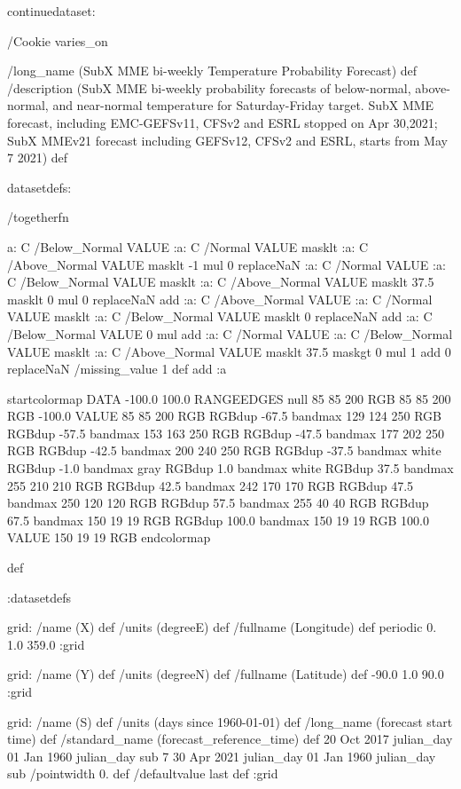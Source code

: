 \begin{ingrid}

continuedataset:



/Cookie varies_on


/long_name (SubX MME bi-weekly Temperature Probability Forecast) def
/description (SubX MME bi-weekly probability forecasts of below-normal, above-normal, and near-normal temperature for Saturday-Friday target. SubX MME forecast, including EMC-GEFSv11, CFSv2 and ESRL stopped on Apr 30,2021; SubX MMEv21 forecast including GEFSv12, CFSv2 and ESRL, starts from May 7 2021) def

datasetdefs:

/togetherfn {
 a:
    C /Below_Normal VALUE
    :a:
     C /Normal VALUE
     masklt
    :a:
     C /Above_Normal VALUE
     masklt
    -1 mul
    0 replaceNaN
    :a:
     C /Normal VALUE
     :a:
      C /Below_Normal VALUE
      masklt
     :a:
      C /Above_Normal VALUE
      masklt
     37.5 masklt
     0 mul
     0 replaceNaN           
     add
    :a:
     C /Above_Normal VALUE
     :a:
      C /Normal VALUE
      masklt
     :a:
      C /Below_Normal VALUE
      masklt
     0 replaceNaN
     add
 :a:
     C /Below_Normal VALUE
     0 mul
     add
    :a:
     C /Normal VALUE
     :a:
      C /Below_Normal VALUE
      masklt
     :a:
      C /Above_Normal VALUE        
      masklt
     37.5 maskgt
     0 mul
     1 add
     0 replaceNaN
     /missing_value 1 def
     add
    :a

startcolormap
DATA -100.0 100.0 RANGEEDGES
null 85 85 200 RGB
85 85 200 RGB -100.0 VALUE
85 85 200 RGB RGBdup -67.5 bandmax
129 124 250 RGB RGBdup -57.5 bandmax
153 163 250 RGB RGBdup -47.5 bandmax
177 202 250 RGB RGBdup -42.5 bandmax
200 240 250 RGB RGBdup -37.5 bandmax
white RGBdup -1.0 bandmax
gray RGBdup 1.0 bandmax
white RGBdup 37.5 bandmax
255 210 210 RGB RGBdup 42.5 bandmax
242 170 170 RGB RGBdup 47.5 bandmax
250 120 120 RGB RGBdup 57.5 bandmax
255 40 40 RGB RGBdup 67.5 bandmax
150 19 19 RGB RGBdup 100.0 bandmax
150 19 19 RGB 100.0 VALUE
150 19 19 RGB
endcolormap
} def 

:datasetdefs


grid:
/name (X) def
/units (degreeE) def
/fullname (Longitude) def
periodic
0. 1.0 359.0
:grid

grid:
/name (Y) def
/units (degreeN) def
/fullname (Latitude) def
-90.0 1.0 90.0
:grid


grid:
/name (S) def
/units (days since 1960-01-01) def
/long_name (forecast start time) def
/standard_name (forecast_reference_time) def
20 Oct 2017 julian_day 01 Jan 1960 julian_day sub
7
30 Apr 2021 julian_day 01 Jan 1960 julian_day sub
/pointwidth 0. def
/defaultvalue { last } def
:grid


\end{ingrid}

